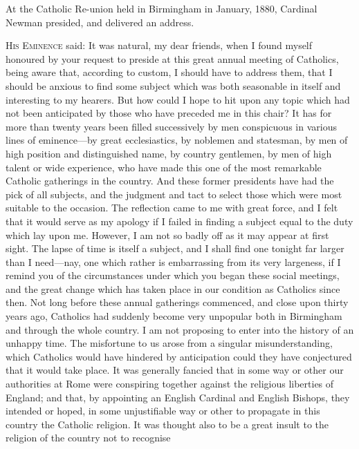 
At the Catholic Re-union held in
Birmingham in January, 1880, Cardinal Newman presided, and delivered
an address.

H\textsc{is} E\textsc{minence}
said: It was natural, my dear friends, when I found myself honoured by
your request to preside at this great annual meeting of Catholics,
being aware that, according to custom, I should have to address them,
that I should be anxious to find some subject which was both
seasonable in itself and interesting to my hearers. But how could I
hope to hit upon any topic which had not been anticipated by those who
have preceded me in this chair? It has for more than twenty years been
filled successively by men conspicuous in various lines of
eminence—by great ecclesiastics, by noblemen and statesman, by men
of high position and distinguished name, by country gentlemen, by men
of high talent or wide experience, who have made this one of the most
remarkable Catholic gatherings in the country. And these former
presidents have had the pick of all subjects, and the judgment and
tact to select those which were most suitable to the occasion. The
reflection came to me with great force, and I felt that it would serve
as my apology if I failed in finding a subject equal to the duty which
lay upon me. However, I am not so badly off as it may appear at first
sight. The lapse of time is itself a subject, and I shall find one
tonight far larger than I need—nay, one which rather is embarrassing
from its very largeness, if I remind you of the circumstances under
which you began these social meetings, and the great change which has
taken place in our condition as Catholics since then. Not long before
these annual gatherings commenced, and close upon thirty years ago,
Catholics had suddenly become very unpopular both in Birmingham and
through the whole country. I am not proposing to enter into the
history of an unhappy time. The misfortune to us arose from a
singular misunderstanding, which Catholics would have hindered by
anticipation could they have conjectured that it would take place. It
was generally fancied that in some way or other our authorities at
Rome were conspiring together against the religious liberties of
England; and that, by appointing an English Cardinal and English
Bishops, they intended or hoped, in some unjustifiable way or other to
propagate in this country the Catholic religion. It was thought also
to be a great insult to the religion of the country not to recognise
